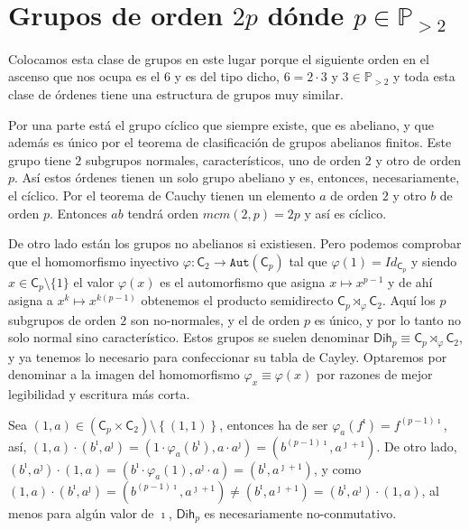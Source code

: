 \documentclass[12pt,a4paper,fleqn,spanish,final,openright]{extbook}
\theoremstyle{definition}
\theoremstyle{remark}
\begin{document}
\chapter{Grupos de orden $2p$ dónde $p    \in \mathds{P}_{>2}$}

Colocamos esta clase de grupos en este lugar porque el siguiente orden en el ascenso que nos ocupa es el $6$ y es del tipo dicho, $6=2     \cdot 3$ y $3     \in \mathds{P}_{>2}$ y toda esta clase de órdenes tiene una estructura de grupos muy similar.

Por una parte está el grupo cíclico que siempre existe, que es abeliano, y que además es único por el teorema de clasificación de grupos abelianos finitos. Este grupo tiene $2$ subgrupos normales, característicos, uno de orden $2$ y otro de orden $p$. Así estos órdenes tienen un solo grupo abeliano y es, entonces, necesariamente, el cíclico. Por el teorema de Cauchy tienen un elemento $a$ de orden $2$ y otro $b$ de orden $p$. Entonces $ab$ tendrá orden $mcm(2,p)=2p$ y así es cíclico.

De otro lado están los grupos no abelianos si existiesen. Pero podemos comprobar que el homomorfismo inyectivo $\varphi : \mathsf{C}_2      \longrightarrow      \mathtt{Aut}(\mathsf{C}_p)$ tal que $\varphi (1)=Id_{\mathsf{C}_{p}}$ y siendo $x     \in {\mathsf{C}_{p}}\setminus\{1\}$ el valor $\varphi (x)$ es el automorfismo que asigna $x      \mapsto x^{p-1}$ y de ahí asigna a $x^k    \mapsto x^{k(p-1)}$ obtenemos el producto semidirecto $\textsf{C}_{p} {\rtimes}_{\varphi } \mathsf{C}_{2}$. Aquí los $p$ subgrupos de orden $2$ son no-normales, y el de orden $p$ es único, y por lo tanto no solo normal sino característico. Estos grupos se suelen denominar $\mathsf{Dih}_{p}    \equiv    \mathsf{C}_{p} {\rtimes}_{\varphi } \mathsf{C}_{2}$, y ya tenemos lo necesario para confeccionar su tabla de Cayley. Optaremos por denominar a la imagen del homomorfismo $\varphi_x     \equiv     \varphi (x)$ por razones de mejor legibilidad y escritura más corta.

Sea $(1,a)    \in \left(\textsf{C}_{p}    \times    \textsf{C}_{2}\right)\setminus\left\lbrace{(1,1)}\right\rbrace$, entonces ha de ser $\varphi_{a}(f^\imath)=f^{(p-1)\imath}$, así, $(1,a)    \cdot (b^\imath,a^\jmath)=(1    \cdot \varphi_a (b^\imath),a     \cdot a^\jmath)=(b^{(p-1)\imath},a^{\jmath + 1})$. De otro lado, $(b^\imath,a^\jmath)    \cdot (1,a)=(b^\imath     \cdot \varphi_a (1),a^\jmath     \cdot a)=(b^{\imath},a^{\jmath + 1})$, y como $(1,a)    \cdot (b^\imath,a^\jmath)=(b^{(p-1)\imath},a^{\jmath + 1})     \neq     (b^{\imath},a^{\jmath + 1}) = (b^\imath,a^\jmath)    \cdot (1,a)$, al menos para algún valor de $\imath$, $\mathsf{Dih}_{p}$ es necesariamente no-conmutativo.
\end{document}
